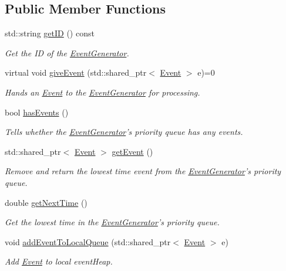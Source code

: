 \subsection*{\-Public \-Member \-Functions}
\begin{DoxyCompactItemize}
\item 
std\-::string \hyperlink{classEventGenerator_a467b319c4317b83b9c16708c9815953d}{get\-I\-D} () const 
\begin{DoxyCompactList}\small\item\em \-Get the \-I\-D of the \hyperlink{classEventGenerator}{\-Event\-Generator}. \end{DoxyCompactList}\item 
virtual void \hyperlink{classEventGenerator_a7448c87e533a9b38c20d914fa6a13c8e}{give\-Event} (std\-::shared\-\_\-ptr$<$ \hyperlink{classEvent}{\-Event} $>$ e)=0
\begin{DoxyCompactList}\small\item\em \-Hands an \hyperlink{classEvent}{\-Event} to the \hyperlink{classEventGenerator}{\-Event\-Generator} for processing. \end{DoxyCompactList}\item 
bool \hyperlink{classEventGenerator_a1fd7fdcaa263115e89a9fc69b85eca22}{has\-Events} ()
\begin{DoxyCompactList}\small\item\em \-Tells whether the \hyperlink{classEventGenerator}{\-Event\-Generator}'s priority queue has any events. \end{DoxyCompactList}\item 
std\-::shared\-\_\-ptr$<$ \hyperlink{classEvent}{\-Event} $>$ \hyperlink{classEventGenerator_ab40fd3a0bf1aa974ba50feb443d81009}{get\-Event} ()
\begin{DoxyCompactList}\small\item\em \-Remove and return the lowest time event from the \hyperlink{classEventGenerator}{\-Event\-Generator}'s priority queue. \end{DoxyCompactList}\item 
double \hyperlink{classEventGenerator_ac4b5ccdeaf232fe59854535bb13747a9}{get\-Next\-Time} ()
\begin{DoxyCompactList}\small\item\em \-Get the lowest time in the \hyperlink{classEventGenerator}{\-Event\-Generator}'s priority queue. \end{DoxyCompactList}\item 
void \hyperlink{classEventGenerator_a3487849484c9b521527d6acacee79e88}{add\-Event\-To\-Local\-Queue} (std\-::shared\-\_\-ptr$<$ \hyperlink{classEvent}{\-Event} $>$ e)
\begin{DoxyCompactList}\small\item\em \-Add \hyperlink{classEvent}{\-Event} to local event\-Heap. \end{DoxyCompactList}\end{DoxyCompactItemize}
